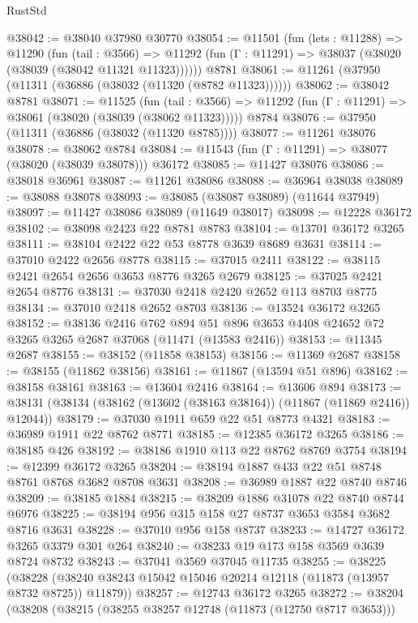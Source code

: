 \begin{lexlean}{RustStd}
\begin{coremodule}
@38042 := @38040 @37980 @30770
@38054 := @11501
    (fun (lets : @11288) =>
    @11290
      (fun (tail : @3566) =>
      @11292 (fun (Γ : @11291) => @38037 (@38020 (@38039 (@38042 @11321 @11323))))))
    @8781
@38061 := @11261 (@37950 (@11311 (@36886 (@38032 (@11320 (@8782 @11323))))))
@38062 := @38042 @8781
@38071 := @11525
    (fun (tail : @3566) => @11292 (fun (Γ : @11291) => @38061 (@38020 (@38039 (@38062 @11323)))))
    @8784
@38076 := @37950 (@11311 (@36886 (@38032 (@11320 @8785))))
@38077 := @11261 @38076
@38078 := @38062 @8784
@38084 := @11543 (fun (Γ : @11291) => @38077 (@38020 (@38039 @38078))) @36172
@38085 := @11427 @38076
@38086 := @38018 @36961
@38087 := @11261 @38086
@38088 := @36964 @38038
@38089 := @38088 @38078
@38093 := @38085 (@38087 @38089) (@11644 @37949)
@38097 := @11427 @38086 @38089 (@11649 @38017)
@38098 := @12228 @36172
@38102 := @38098 @2423 @22 @8781 @8783
@38104 := @13701 @36172 @3265
@38111 := @38104 @2422 @22 @53 @8778 @3639 @8689 @3631
@38114 := @37010 @2422 @2656 @8778
@38115 := @37015 @2411
@38122 := @38115 @2421 @2654 @2656 @3653 @8776 @3265 @2679
@38125 := @37025 @2421 @2654 @8776
@38131 := @37030 @2418 @2420 @2652 @113 @8703 @8775
@38134 := @37010 @2418 @2652 @8703
@38136 := @13524 @36172 @3265
@38152 := @38136
    @2416
    @762
    @894
    @51
    @896
    @3653
    @4408
    @24652
    @72
    @3265
    @3265
    @2687
    @37068
    (@11471 (@13583 @2416))
@38153 := @11345 @2687
@38155 := @38152 (@11858 @38153)
@38156 := @11369 @2687
@38158 := @38155 (@11862 @38156)
@38161 := @11867 (@13594 @51 @896)
@38162 := @38158 @38161
@38163 := @13604 @2416
@38164 := @13606 @894
@38173 := @38131 (@38134 (@38162 (@13602 (@38163 @38164)) (@11867 (@11869 @2416)) @12044))
@38179 := @37030 @1911 @659 @22 @51 @8773 @4321
@38183 := @36989 @1911 @22 @8762 @8771
@38185 := @12385 @36172 @3265
@38186 := @38185 @426
@38192 := @38186 @1910 @113 @22 @8762 @8769 @3754
@38194 := @12399 @36172 @3265
@38204 := @38194 @1887 @433 @22 @51 @8748 @8761 @8768 @3682 @8708 @3631
@38208 := @36989 @1887 @22 @8740 @8746
@38209 := @38185 @1884
@38215 := @38209 @1886 @31078 @22 @8740 @8744 @6976
@38225 := @38194 @956 @315 @158 @27 @8737 @3653 @3584 @3682 @8716 @3631
@38228 := @37010 @956 @158 @8737
@38233 := @14727 @36172 @3265 @3379 @301 @264
@38240 := @38233 @19 @173 @158 @3569 @3639 @8724 @8732
@38243 := @37041 @3569 @37045 @11735
@38255 := @38225
    (@38228 (@38240 @38243 @15042 @15046 @20214 @12118 (@11873 (@13957 @8732 @8725)) @11879))
@38257 := @12743 @36172 @3265
@38272 := @38204
    (@38208
      (@38215
        (@38255 @38257 @12748 (@11873 (@12750 @8717 @3653)))

\end{coremodule}
\end{lexlean}
